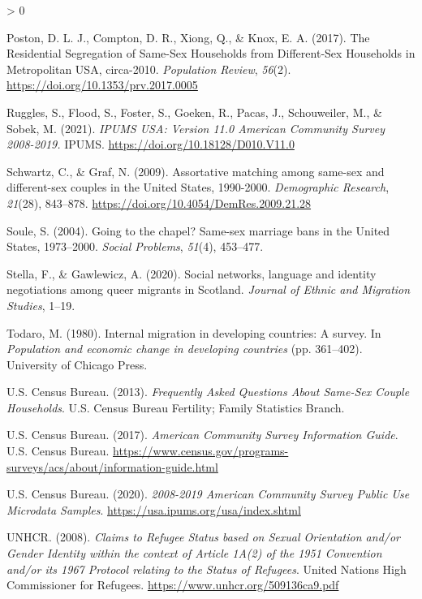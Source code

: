 \documentclass[
  11pt,
]{article}
\newlength{\cslhangindent}
\newenvironment{CSLReferences}[2] %
 {%
  \setlength{\parindent}{0pt}
  \ifodd #1 \everypar{\setlength{\hangindent}{\cslhangindent}}\ignorespaces\fi
  \ifnum #2 > 0
  \setlength{\parskip}{#2\baselineskip}
  \fi
 }%
 {}
\begin{document}
\begin{CSLReferences}{1}{0}
\leavevmode\hypertarget{ref-poston_2017}{}%
Poston, D. L. J., Compton, D. R., Xiong, Q., \& Knox, E. A. (2017). The {Residential} {Segregation} of {Same}-{Sex} {Households} from {Different}-{Sex} {Households} in {Metropolitan} {USA}, circa-2010. \emph{Population Review}, \emph{56}(2). \url{https://doi.org/10.1353/prv.2017.0005}

\leavevmode\hypertarget{ref-ruggles_2021}{}%
Ruggles, S., Flood, S., Foster, S., Goeken, R., Pacas, J., Schouweiler, M., \& Sobek, M. (2021). \emph{{IPUMS} {USA}: {Version} 11.0 {American} {Community} {Survey} 2008-2019.} IPUMS. \url{https://doi.org/10.18128/D010.V11.0}

\leavevmode\hypertarget{ref-schwartz_2009}{}%
Schwartz, C., \& Graf, N. (2009). Assortative matching among same-sex and different-sex couples in the {United} {States}, 1990-2000. \emph{Demographic Research}, \emph{21}(28), 843--878. \url{https://doi.org/10.4054/DemRes.2009.21.28}

\leavevmode\hypertarget{ref-soule_2004}{}%
Soule, S. (2004). Going to the chapel? {Same}-sex marriage bans in the {United} {States}, 1973--2000. \emph{Social Problems}, \emph{51}(4), 453--477.

\leavevmode\hypertarget{ref-stella_2020}{}%
Stella, F., \& Gawlewicz, A. (2020). Social networks, language and identity negotiations among queer migrants in {Scotland}. \emph{Journal of Ethnic and Migration Studies}, 1--19.

\leavevmode\hypertarget{ref-todaro_1980}{}%
Todaro, M. (1980). Internal migration in developing countries: A survey. In \emph{Population and economic change in developing countries} (pp. 361--402). University of Chicago Press.

\leavevmode\hypertarget{ref-u.s.censusbureau_2013}{}%
U.S. Census Bureau. (2013). \emph{Frequently {Asked} {Questions} {About} {Same}-{Sex} {Couple} {Households}}. U.S. Census Bureau Fertility; Family Statistics Branch.

\leavevmode\hypertarget{ref-u.s.censusbureau_2017}{}%
U.S. Census Bureau. (2017). \emph{American {Community} {Survey} {Information} {Guide}}. U.S. Census Bureau. \url{https://www.census.gov/programs-surveys/acs/about/information-guide.html}

\leavevmode\hypertarget{ref-u.s.censusbureau_2020}{}%
U.S. Census Bureau. (2020). \emph{2008-2019 {American} {Community} {Survey} {Public} {Use} {Microdata} {Samples}}. \url{https://usa.ipums.org/usa/index.shtml}

\leavevmode\hypertarget{ref-unhcr_2008}{}%
UNHCR. (2008). \emph{Claims to {Refugee} {Status} based on {Sexual} {Orientation} and/or {Gender} {Identity} within the context of {Article} {1A}(2) of the 1951 {Convention} and/or its 1967 {Protocol} relating to the {Status} of {Refugees}}. United Nations High Commissioner for Refugees. \url{https://www.unhcr.org/509136ca9.pdf}


\end{CSLReferences}
\end{document}
